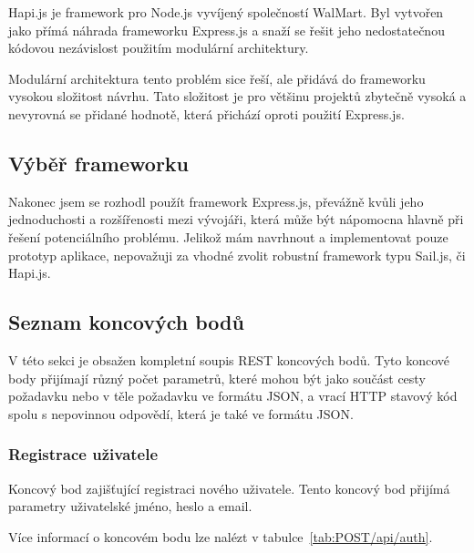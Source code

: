 Hapi.js je framework pro Node.js vyvíjený společností WalMart.
Byl vytvořen jako přímá náhrada frameworku Express.js a snaží se řešit jeho nedostatečnou kódovou nezávislost použitím modulární architektury.

Modulární architektura tento problém sice řeší, ale přidává do frameworku vysokou složitost návrhu.
Tato složitost je pro většinu projektů zbytečně vysoká a nevyrovná se přidané hodnotě, která přichází oproti použití Express.js.

\subsection{Výběř frameworku}\label{subsec:výběřFrameworku}

Nakonec jsem se rozhodl použít framework Express.js, převážně kvůli jeho jednoduchosti a rozšířenosti mezi vývojáři, která může být nápomocna hlavně při řešení potenciálního problému.
Jelikož mám navrhnout a implementovat pouze prototyp aplikace, nepovažuji za vhodné zvolit robustní framework typu Sail.js, či Hapi.js.

\subsection{Seznam koncových bodů}\label{subsec:seznamKoncovýchBodů}

V této sekci je obsažen kompletní soupis \gls{REST} koncových bodů.
Tyto koncové body přijímají různý počet parametrů, které mohou být jako součást cesty požadavku nebo v těle požadavku ve formátu \gls{JSON}, a vrací \gls{HTTP} stavový kód spolu s nepovinnou odpovědí, která je také ve formátu \gls{JSON}.

\subsubsection{Registrace uživatele}

Koncový bod zajišťující registraci nového uživatele.
Tento koncový bod přijímá parametry uživatelské jméno, heslo a email.

Více informací o koncovém bodu lze nalézt v tabulce~\ref{tab:POST/api/auth}.

